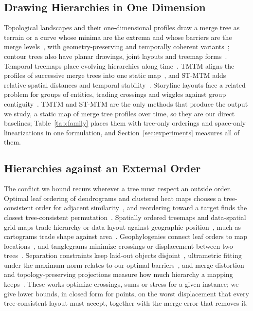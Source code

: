 \subsection{Drawing Hierarchies in One Dimension}
Topological landscapes and their one-dimensional profiles draw a merge tree as terrain or a curve whose minima are the extrema and whose barriers are the merge levels~\cite{Weber:2007:TL,Oesterling:2013:TLP}, with geometry-preserving and temporally coherent variants~\cite{Beketayev:2012:GPTL,Herick:2020:TCTL}; contour trees also have planar drawings, joint layouts and treemap forms~\cite{Heine:2011:DCT,Lohfink:2020:FCT,Kamakshidasan:2021:MM}. Temporal treemaps place evolving hierarchies along time~\cite{Koepp:2019:TT}. TMTM aligns the profiles of successive merge trees into one static map~\cite{Koepp:2023:TMTM}, and ST-MTM adds relative spatial distances and temporal stability~\cite{STMTM:2026}. Storyline layouts face a related problem for groups of entities, trading crossings and wiggles against group contiguity~\cite{Tanahashi:2012:Storyline,Liu:2013:SF,Dobler:2025:Wiggle}. TMTM and ST-MTM are the only methods that produce the output we study, a static map of merge tree profiles over time, so they are our direct baselines; Table~\ref{tab:family} places them with tree-only orderings and space-only linearizations in one formulation, and Section~\ref{sec:experiments} measures all of them.

\subsection{Hierarchies against an External Order}
The conflict we bound recurs wherever a tree must respect an outside order. Optimal leaf ordering of dendrograms and clustered heat maps chooses a tree-consistent order for adjacent similarity~\cite{BarJoseph:2001:OLO,Eisen:1998:CA}, and reordering toward a target finds the closest tree-consistent permutation~\cite{Bulteau:2022:RT}. Spatially ordered treemaps and data-spatial grid maps trade hierarchy or data layout against geographic position~\cite{Wood:2008:SOT,vanBeusekom:2023:DSL}, much as cartograms trade shape against area~\cite{Nusrat:2016:CART}. Geophylogenies connect leaf orders to map locations~\cite{Klawitter:2025:GP}, and tanglegrams minimize crossings or displacement between two trees~\cite{Fernau:2010:CTC,Huson:2026:DOT,Dobler:2026:BCT}. Separation constraints keep laid-out objects disjoint~\cite{Dwyer:2006:IPSEP,Li:2019:SOI}, ultrametric fitting under the maximum norm relates to our optimal barriers~\cite{Farach:1995:RM,Chepoi:2000:LIA}, and merge distortion and topology-preserving projections measure how much hierarchy a mapping keeps~\cite{Eldridge:2015:MD,Doraiswamy:2021:TM,Rieck:2015:PH}. These works optimize crossings, sums or stress for a given instance; we give lower bounds, in closed form for points, on the worst displacement that every tree-consistent layout must accept, together with the merge error that removes it.

